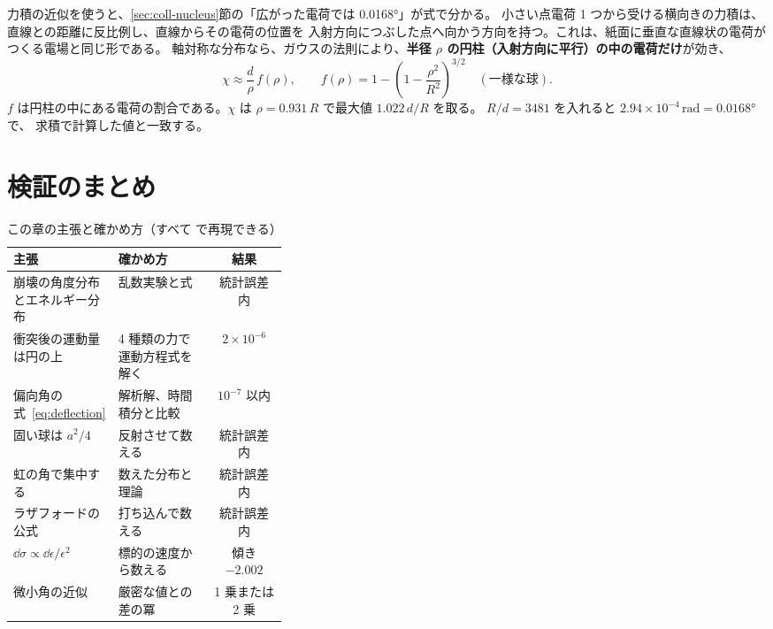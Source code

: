 力積の近似を使うと、\ref{sec:coll-nucleus}節の「広がった電荷では \ang{0.0168}」が式で分かる。
小さい点電荷 1 つから受ける横向きの力積は、直線との距離に反比例し、直線からその電荷の位置を
入射方向につぶした点へ向かう方向を持つ。これは、紙面に垂直な直線状の電荷がつくる電場と同じ形である。
軸対称な分布なら、ガウスの法則により、\textbf{半径 $\rho$ の円柱（入射方向に平行）の中の電荷だけ}が効き、
\begin{equation}
  \chi\approx\frac{d}{\rho}\,f(\rho),\qquad
  f(\rho)=1-\left(1-\frac{\rho^2}{R^2}\right)^{3/2}\quad(\text{一様な球}).
  \label{eq:projected}
\end{equation}
$f$ は円柱の中にある電荷の割合である。$\chi$ は $\rho=0.931\,R$ で最大値 $1.022\,d/R$ を取る。
$R/d=3481$ を入れると $2.94\times10^{-4}\,\mathrm{rad}=\ang{0.0168}$ で、
求積で計算した値と一致する。

\clearpage %
\section{検証のまとめ}\label{sec:coll-check}

\begin{table}[htbp]
\centering
\caption{この章の主張と確かめ方（すべて  で再現できる）}\label{tab:coll-check}
\begin{tabularx}{\linewidth}{@{}>{\raggedright\arraybackslash}p{0.36\linewidth}Lc@{}}
\toprule
主張 & 確かめ方 & 結果 \\
\midrule
崩壊の角度分布とエネルギー分布 & 乱数実験と式 & 統計誤差内 \\
衝突後の運動量は円の上 & 4 種類の力で運動方程式を解く & $2\times10^{-6}$ \\
偏向角の式~\eqref{eq:deflection} & 解析解、時間積分と比較 & $10^{-7}$ 以内 \\
固い球は $a^2/4$ & 反射させて数える & 統計誤差内 \\
虹の角で集中する & 数えた分布と理論 & 統計誤差内 \\
ラザフォードの公式 & 打ち込んで数える & 統計誤差内 \\
$\dd\sigma\propto\dd\epsilon/\epsilon^2$ & 標的の速度から数える & 傾き $-2.002$ \\
微小角の近似 & 厳密な値との差の冪 & 1 乗または 2 乗 \\
\bottomrule
\end{tabularx}
\end{table}

